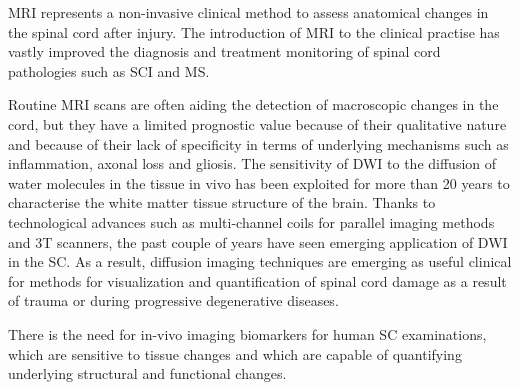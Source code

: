 \Gls{MRI} represents a non-invasive clinical method to assess anatomical changes in the spinal cord after injury. The introduction of \gls{MRI} to the clinical practise has vastly improved the diagnosis and treatment monitoring of spinal cord pathologies such as \gls{SCI} and \gls{MS}. 

Routine \gls{MRI} scans are often aiding the detection of macroscopic changes in the cord, but they have a limited prognostic value because of their qualitative nature and because of their lack of specificity in terms of underlying mechanisms such as inflammation, axonal loss and gliosis. The sensitivity of {\gls{DWI}} to the diffusion of water molecules in the tissue in vivo has been exploited for more than 20 years to characterise the white matter tissue structure of the brain. Thanks to technological advances such as multi-channel coils for parallel imaging methods and 3T scanners, the past couple of years have seen emerging application of \gls{DWI} in the {\gls{SC}}. As a result, diffusion imaging techniques are emerging as useful clinical for methods for visualization and quantification of spinal cord damage as a result of trauma or during progressive degenerative diseases. 

There is the need for in-vivo imaging biomarkers for human {\gls{SC}} examinations, which are sensitive to tissue changes and which are capable of quantifying underlying structural and functional changes.




